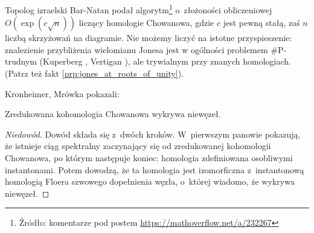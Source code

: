 Topolog izraelski Bar-Natan \cite{barnatan07} podał algorytm\footnote{Źródło: komentarze pod postem \url{https://mathoverflow.net/a/232267}} o~złożoności obliczeniowej $O(\exp(c \sqrt n))$ liczący homologie Chowanowa, gdzie $c$ jest pewną stałą, zaś $n$ liczbą skrzyżowań na diagramie.
%
Nie możemy liczyć na istotne przyspieszenie:
znalezienie przybliżenia wielomianu Jonesa jest w ogólności problemem \#P-trudnym (Kuperberg \cite{kuperberg15}, Vertigan \cite{vertigan05}),
%
%
ale trywialnym przy znanych homologiach.
(Patrz też fakt \ref{prp:jones_at_roots_of_unity}).

Kronheimer, Mrówka \cite{kronheimer11} pokazali:
%
%

\begin{proposition}
\label{khovanov_detects_unknot}%
    Zredukowana kohomologia Chowanowa wykrywa niewęzeł.
\end{proposition}

\begin{proof}[Niedowód]
%
    Dowód składa się z~dwóch kroków.
    W~pierwszym panowie pokazują, że istnieje ciąg spektralny zaczynający się od zredukowanej kohomologii Chowanowa, po którym następuje koniec: homologia zdefiniowana osobliwymi instantonami.
    Potem dowodzą, że ta homologia jest izomorficzna z~instantonową homologią Floera szwowego dopełnienia węzła, o~której wiadomo, że wykrywa niewęzeł.
%
\end{proof}



